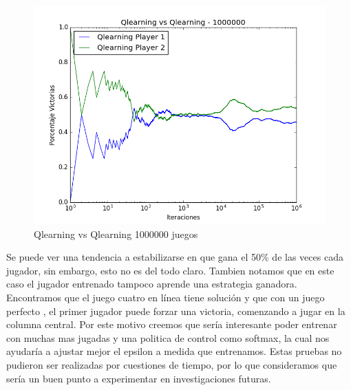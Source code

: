 \begin{figure}[H]
 \centering
 \begin{minipage}{.45\textwidth}
	\centering
	\includegraphics[scale=0.35]{resultados/7x6/QlearningVsQlearning_1000000_7x6_parametros_informe.png}
        \caption{Qlearning vs Qlearning 1000000 juegos}
  \end{minipage}
\end{figure}

Se puede ver una tendencia a estabilizarse en que gana el 50\% de las veces cada jugador, sin embargo, esto no es del todo claro. Tambien notamos que en este caso el jugador entrenado tampoco aprende una estrategia ganadora. \\


Encontramos que el juego cuatro en línea tiene solución y que con un juego perfecto , el primer jugador puede forzar una victoria, comenzando a jugar en la columna central. Por este motivo creemos que sería interesante poder entrenar con muchas mas jugadas y una politica de control como softmax, la cual nos ayudaría a ajustar mejor el epsilon a medida que entrenamos. Estas pruebas no pudieron ser realizadas por cuestiones de tiempo, por lo que consideramos que sería un buen punto a experimentar en investigaciones futuras.





